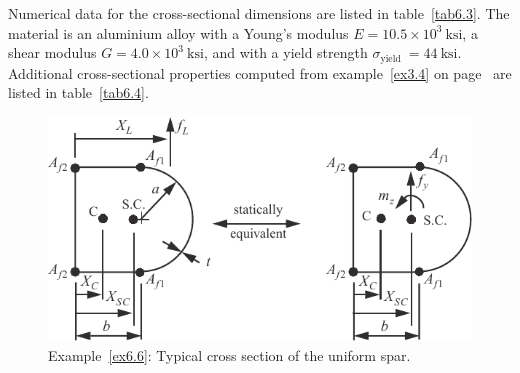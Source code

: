 \documentclass{AeroStructure-ERJohnson}
\begin{document}
\begin{example*}
Numerical data for the cross-sectional dimensions are listed in table~\ref{tab6.3}.
The material is an aluminium alloy with a Young's modulus $E=10.5 \times 10^{3}~\mathrm{ksi}$, a shear modulus $G=4.0 \times 10^{3}~\mathrm{ksi}$, and with a yield strength $\sigma_{\text {yield }}=44~\mathrm{ksi}$. Additional cross-sectional properties computed from example~\ref{ex3.4} on page~\pageref{ex3.4}  are listed in table~\ref{tab6.4}.

\begin{figure}[!h]
\centerline{\includegraphics{Figure_6-13.pdf}}
\caption{Example~\ref{ex6.6}: Typical cross section of the uniform spar.}\label{fig6.13}
\end{figure}

\begin{table}[!h]%
\bigskip
\end{table}


\end{example*}
\end{document}
